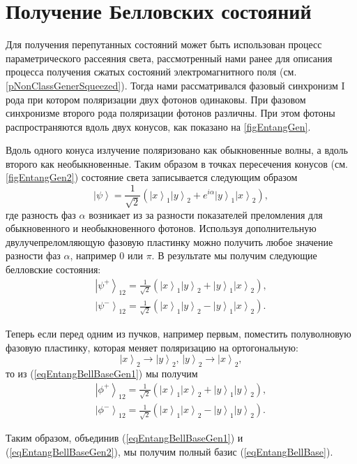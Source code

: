 \section{Получение Белловских состояний}
\label{subsecPart3NonclassEntanglBelGener}

Для получения перепутанных состояний может быть использован процесс
параметрического рассеяния света, рассмотренный нами ранее для
описания процесса получения сжатых состояний электромагнитного
поля (см. \ref{pNonClassGenerSqueezed}). Тогда нами рассматривался
фазовый синхронизм I рода при котором поляризации двух фотонов
одинаковы. При фазовом синхронизме второго рода поляризации фотонов
различны. При этом фотоны распространяются вдоль двух конусов, как
показано на \autoref{figEntangGen}. 



Вдоль одного конуса излучение поляризовано
как обыкновенные волны, а вдоль второго как необыкновенные. Таким
образом в точках пересечения конусов (см. \autoref{figEntangGen2})
состояние света записывается следующим образом
\begin{equation}
\left|\psi\right> =
  \frac{1}{\sqrt{2}}\left(
  \left|x\right>_1\left|y\right>_2 + e^{i \alpha}
  \left|y\right>_1\left|x\right>_2
  \right),
\nonumber
\end{equation}
где разность фаз $\alpha$ возникает из за разности показателей
преломления для обыкновенного и необыкновенного фотонов. Используя
дополнительную двулучепреломляющую фазовую пластинку можно получить
любое значение разности фаз
$\alpha$, например $0$ или $\pi$. В результате мы получим следующие белловские состояния:
\begin{eqnarray}
  \left|\psi^{+}\right>_{12} = 
  \frac{1}{\sqrt{2}}\left(
  \left|x\right>_1\left|y\right>_2 + 
  \left|y\right>_1\left|x\right>_2
  \right),
  \nonumber \\
  \left|\psi^{-}\right>_{12} = 
  \frac{1}{\sqrt{2}}\left(
  \left|x\right>_1\left|y\right>_2 - 
  \left|y\right>_1\left|x\right>_2
  \right).
  \label{eqEntangBellBaseGen1}
\end{eqnarray}



Теперь если перед одним из пучков, например первым, поместить полуволновую фазовую
пластинку, которая меняет поляризацию на ортогональную:
\begin{equation}
\left|x\right>_2 \rightarrow \left|y\right>_2, \, \left|y\right>_2 \rightarrow \left|x\right>_2,
\nonumber
\end{equation}
то из (\ref{eqEntangBellBaseGen1}) мы получим
\begin{eqnarray}
  \left|\phi^{+}\right>_{12} = 
  \frac{1}{\sqrt{2}}\left(
  \left|x\right>_1\left|x\right>_2 + 
  \left|y\right>_1\left|y\right>_2
  \right),
  \nonumber \\
  \left|\phi^{-}\right>_{12} = 
  \frac{1}{\sqrt{2}}\left(
  \left|x\right>_1\left|x\right>_2 - 
  \left|y\right>_1\left|y\right>_2
  \right).
  \label{eqEntangBellBaseGen2}
\end{eqnarray}

Таким образом, объединив (\ref{eqEntangBellBaseGen1}) и
(\ref{eqEntangBellBaseGen2}), мы получим полный базис (\ref{eqEntangBellBase}).



